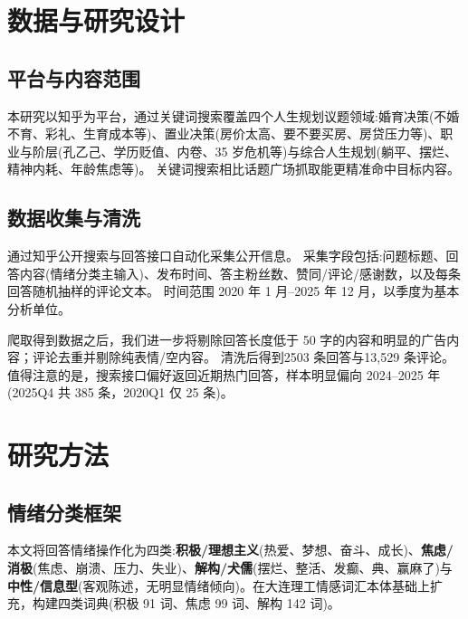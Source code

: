 \documentclass[11pt,a4paper]{ctexart}
\begin{document}
\section{数据与研究设计}

\subsection{平台与内容范围}
本研究以知乎为平台，通过关键词搜索覆盖四个人生规划议题领域:婚育决策(不婚不育、彩礼、生育成本等)、置业决策(房价太高、要不要买房、房贷压力等)、职业与阶层(孔乙己、学历贬值、内卷、35 岁危机等)与综合人生规划(躺平、摆烂、精神内耗、年龄焦虑等)。
关键词搜索相比话题广场抓取能更精准命中目标内容。

\subsection{数据收集与清洗}
通过知乎公开搜索与回答接口自动化采集公开信息。
采集字段包括:问题标题、回答内容(情绪分类主输入)、发布时间、答主粉丝数、赞同/评论/感谢数，以及每条回答随机抽样的评论文本。
时间范围 2020 年 1 月--2025 年 12 月，以季度为基本分析单位。

爬取得到数据之后，我们进一步将剔除回答长度低于 50 字的内容和明显的广告内容；评论去重并剔除纯表情/空内容。
清洗后得到2503 条回答与13,529 条评论。值得注意的是，搜索接口偏好返回近期热门回答，样本明显偏向 2024--2025 年(2025Q4 共 385 条，2020Q1 仅 25 条)。


\section{研究方法}

\subsection{情绪分类框架}
本文将回答情绪操作化为四类:\textbf{积极/理想主义}(热爱、梦想、奋斗、成长)、\textbf{焦虑/消极}(焦虑、崩溃、压力、失业)、\textbf{解构/犬儒}(摆烂、整活、发癫、典、赢麻了)与\textbf{中性/信息型}(客观陈述，无明显情绪倾向)。在大连理工情感词汇本体基础上扩充，构建四类词典(积极 91 词、焦虑 99 词、解构 142 词)。
\end{document}
